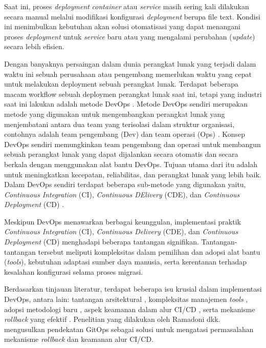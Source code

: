 Saat ini, proses \textit{deployment} \textit{container} atau \textit{service} masih sering
kali dilakukan secara manual melalui modifikasi konfigurasi \textit{deployment} berupa file text.
Kondisi ini menimbulkan kebutuhan akan solusi otomatisasi yang dapat menangani proses
\textit{deployment} untuk \textit{service} baru atau yang mengalami perubahan (\textit{update}) secara lebih efisien.
\par
Dengan banyaknya persaingan dalam dunia perangkat lunak yang terjadi dalam waktu ini sebuah perusahaan
atau pengembang memerlukan waktu yang cepat untuk melakukan deployment sebuah perangkat lunak. Terdapat beberapa macam
workflow sebuah deploymen perangkat lunak saat ini, tetapi yang industri saat ini lakukan adalah metode DevOps \cite{Bass2018}.
Metode DevOps sendiri merupakan metode yang digunakan untuk mengembangkan perangkat lunak yang
menjembatani antara dua team yang terisolasi dalam struktur organisasi, contohnya adalah team pengembang (Dev)
dan team operasi (Ops) \cite{Bolscher2019}. Konsep DevOps \cite{Bass2018} sendiri memungkinkan team pengembang dan operasi
untuk membangun sebuah perangkat lunak yang dapat dijalankan secara otomatis dan secara berkala dengan menggunakan alat bantu DevOps.
Tujuan utama dari itu adalah untuk meningkatkan kecepatan, reliabilitas, dan perangkat lunak yang lebih baik.
Dalam DevOps sendiri terdapat beberapa sub-metode yang digunakan yaitu, \textit{Continuous Integration} (CI), \textit{Continuous DElivery} (CDE),
dan \textit{Continuous Deployment} (CD)  \cite{phoenix2013}.
\par
Meskipun DevOps menawarkan berbagai keunggulan, implementasi praktik
\textit{Continuous Integration} (CI), \textit{Continuous Delivery} (CDE), dan \textit{Continuous Deployment} (CD) menghadapi beberapa tantangan signifikan.
Tantangan-tantangan tersebut meliputi kompleksitas dalam pemilihan dan adopsi
alat bantu (\textit{tools}), kebutuhan adaptasi sumber daya manusia, serta
kerentanan terhadap kesalahan konfigurasi selama proses migrasi.

Berdasarkan tinjauan literatur,
terdapat beberapa isu krusial dalam implementasi DevOps,
antara lain: tantangan arsitektural \cite{Bolscher2019}, kompleksitas manajemen
\textit{tools} \cite{Proulx2018}, adopsi metodologi baru \cite{Abbass2019, Leite2019},
aspek keamanan dalam alur CI/CD \cite{Shahin2017}, serta mekanisme \textit{rollback}
yang efektif \cite{Fritzsch2019}. Penelitian yang dilakukan oleh Ramadoni dkk.
\cite{Ramadoni2021} mengusulkan pendekatan GitOps sebagai solusi untuk mengatasi
permasalahan mekanisme \textit{rollback} dan keamanan alur CI/CD.


